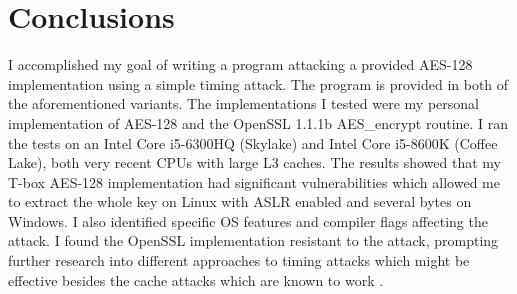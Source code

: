 \documentclass{article}
\begin{document}
\section{Conclusions}

I accomplished my goal of writing a program attacking a provided AES-128 implementation using a simple timing attack.
The program is provided in both of the aforementioned variants.
The implementations I tested were my personal implementation of AES-128 and the OpenSSL 1.1.1b AES\_encrypt routine.
I ran the tests on an Intel Core i5-6300HQ (Skylake) and Intel Core i5-8600K (Coffee Lake), both very recent CPUs with large L3 caches.
The results showed that my T-box AES-128 implementation had significant vulnerabilities which allowed me to extract the whole key on Linux with ASLR enabled and several bytes on Windows.
I also identified specific OS features and compiler flags affecting the attack.
I found the OpenSSL implementation resistant to the attack, prompting further research into different approaches to timing attacks which might be effective besides the cache attacks which are known to work \cite{ASHOKKUMAR}.


\printbibliography[title={References}]
\end{document}
